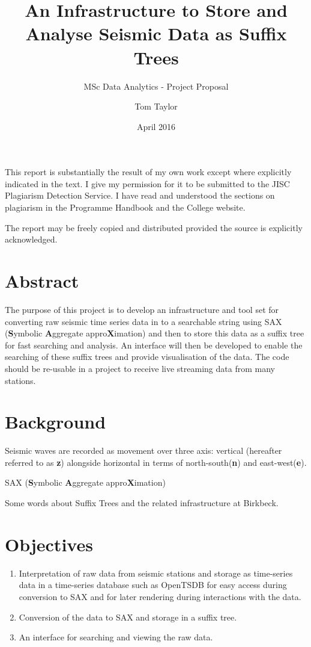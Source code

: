 \documentclass[11pt]{scrartcl}
\title{An Infrastructure to Store and Analyse Seismic Data as Suffix Trees}
\subtitle{MSc Data Analytics - Project Proposal}
\date{April 2016}
\author{Tom Taylor}
\begin{document}
\maketitle
\begin{itshape}
	\noindent This report is substantially the result of my own work except where explicitly
	indicated in the text. I give my permission for it to be submitted to the JISC
	Plagiarism Detection Service. I have read and understood the sections on plagiarism
	in the Programme Handbook and the College website.
	
	\noindent The report may be freely copied and distributed provided the source is explicitly
	acknowledged.
\end{itshape}

\tableofcontents

\newpage

\section{Abstract}
	The purpose of this project is to develop an infrastructure and tool set for converting raw seismic time series data in to a searchable string using SAX (\textbf{S}ymbolic \textbf{A}ggregate appro\textbf{X}imation) and then to store this data as a suffix tree for fast searching and analysis.  An interface will then be developed to enable the searching of these suffix trees and provide visualisation of the data.  The code should be re-usable in a project to receive live streaming data from many stations.
	
\section{Background}
	Seismic waves are recorded as movement over three axis: vertical (hereafter referred to as \textbf{z}) alongside horizontal in terms of north-south(\textbf{n}) and east-west(\textbf{e}).
	
	\noindent SAX (\textbf{S}ymbolic \textbf{A}ggregate appro\textbf{X}imation) \citep{saxnovel}
	
	\noindent Some words about Suffix Trees and the related infrastructure at Birkbeck. \citep{timeseriessuffix}

\section{Objectives}
\begin{enumerate}
	\item Interpretation of raw data from seismic stations and storage as time-series data in a time-series database such as OpenTSDB for easy access during conversion to SAX and for later rendering during interactions with the data.
	\item Conversion of the data to SAX and storage in a suffix tree.
	\item An interface for searching and viewing the raw data.
\end{enumerate}
\end{document}
